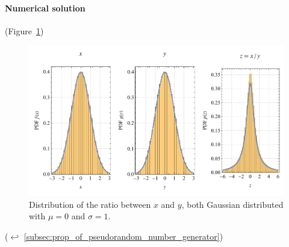 \newpage

\paragraph{Numerical solution} (Figure~\ref{fig:change_of_var_ratio})

\begin{figure}[h]
	\includegraphics[width=\linewidth]{exercise/change_of_var_ratio.pdf}
	\caption[Distribution of the ratio between $x$ and $y$, both Gaussian distributed.]{Distribution of the ratio between $x$ and $y$, both Gaussian distributed with $\mu = 0$ and $\sigma = 1$.}
	\label{fig:change_of_var_ratio}
\end{figure}

($\hookleftarrow$ \ref{subsec:prop_of_pseudorandom_number_generator})
